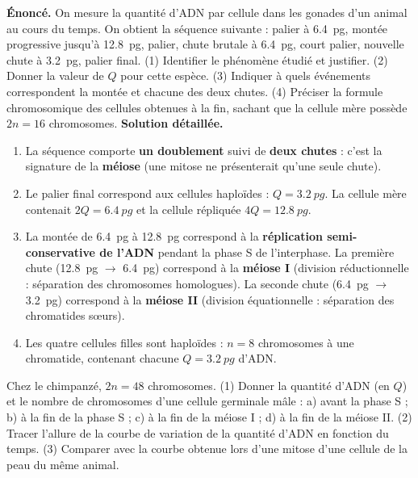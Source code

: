 \documentclass[11pt]{article}
\begin{document}
\begin{exoresolu}
\textbf{Énoncé.} On mesure la quantité d'ADN par cellule dans les gonades d'un animal au cours du temps. On obtient la séquence suivante : palier à \SI{6,4}{pg}, montée progressive jusqu'à \SI{12,8}{pg}, palier, chute brutale à \SI{6,4}{pg}, court palier, nouvelle chute à \SI{3,2}{pg}, palier final. (1) Identifier le phénomène étudié et justifier. (2) Donner la valeur de $Q$ pour cette espèce. (3) Indiquer à quels événements correspondent la montée et chacune des deux chutes. (4) Préciser la formule chromosomique des cellules obtenues à la fin, sachant que la cellule mère possède $2n = 16$ chromosomes.
\tcblower
\textbf{Solution détaillée.}
\begin{enumerate}
\item La séquence comporte \textbf{un doublement} suivi de \textbf{deux chutes} : c'est la signature de la \textbf{méiose} (une mitose ne présenterait qu'une seule chute).
\item Le palier final correspond aux cellules haploïdes : $Q = \SI{3,2}{pg}$. La cellule mère contenait $2Q = \SI{6,4}{pg}$ et la cellule répliquée $4Q = \SI{12,8}{pg}$.
\item La montée de \SI{6,4}{pg} à \SI{12,8}{pg} correspond à la \textbf{réplication semi-conservative de l'ADN} pendant la phase S de l'interphase. La première chute (\SI{12,8}{pg} $\rightarrow$ \SI{6,4}{pg}) correspond à la \textbf{méiose I} (division réductionnelle : séparation des chromosomes homologues). La seconde chute (\SI{6,4}{pg} $\rightarrow$ \SI{3,2}{pg}) correspond à la \textbf{méiose II} (division équationnelle : séparation des chromatides sœurs).
\item Les quatre cellules filles sont haploïdes : $n = 8$ chromosomes à une chromatide, contenant chacune $Q = \SI{3,2}{pg}$ d'ADN.
\end{enumerate}
\end{exoresolu}

\begin{exercice}
Chez le chimpanzé, $2n = 48$ chromosomes. (1) Donner la quantité d'ADN (en $Q$) et le nombre de chromosomes d'une cellule germinale mâle : a) avant la phase S ; b) à la fin de la phase S ; c) à la fin de la méiose I ; d) à la fin de la méiose II. (2) Tracer l'allure de la courbe de variation de la quantité d'ADN en fonction du temps. (3) Comparer avec la courbe obtenue lors d'une mitose d'une cellule de la peau du même animal.
\end{exercice}
\end{document}
